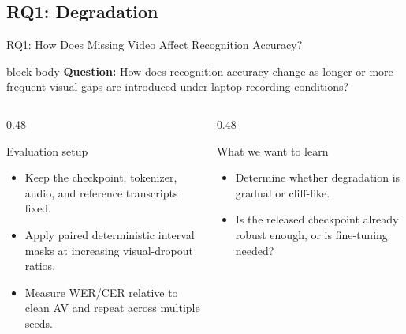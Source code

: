 
\subsection{RQ1: Degradation}

\begin{frame}{RQ1: How Does Missing Video Affect Recognition Accuracy?}
  \small
  \begin{beamercolorbox}[wd=\textwidth,sep=0.70em,center,rounded=true]{block body}
    \textbf{Question:} How does recognition accuracy change as longer or more frequent visual gaps are introduced under laptop-recording conditions?
  \end{beamercolorbox}
  \vspace{0.16cm}

  \begin{columns}[T,onlytextwidth]
    \begin{column}{0.48\textwidth}
      \begin{block}{Evaluation setup}
        \begin{itemize}
          \item Keep the checkpoint, tokenizer, audio, and reference transcripts fixed.
          \item Apply paired deterministic interval masks at increasing visual-dropout ratios.
          \item Measure WER/CER relative to clean AV and repeat across multiple seeds.
        \end{itemize}
      \end{block}
    \end{column}
    \begin{column}{0.48\textwidth}
      \begin{block}{What we want to learn}
        \begin{itemize}
          \item Determine whether degradation is gradual or cliff-like.
          \item Is the released checkpoint already robust enough, or is fine-tuning needed?
        \end{itemize}
      \end{block}
    \end{column}
  \end{columns}
\end{frame}

